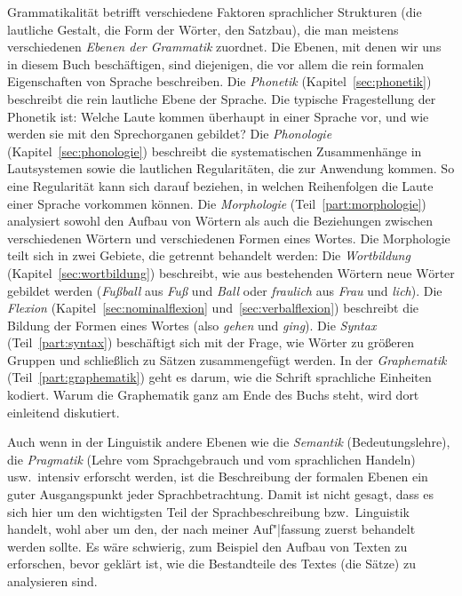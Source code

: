 Grammatikalität betrifft verschiedene Faktoren sprachlicher Strukturen (\zB die lautliche Gestalt, die Form der Wörter, den Satzbau), die man meistens verschiedenen \textit{Ebenen der Grammatik} zuordnet.
Die Ebenen, mit denen wir uns in diesem Buch beschäftigen, sind diejenigen, die vor allem die rein formalen Eigenschaften von Sprache beschreiben.
Die \textit{Phonetik} (Kapitel~\ref{sec:phonetik}) beschreibt die rein lautliche Ebene der Sprache.
Die typische Fragestellung der Phonetik ist:
Welche Laute kommen überhaupt in einer Sprache vor, und wie werden sie mit den Sprechorganen gebildet?
Die \textit{Phonologie} (Kapitel~\ref{sec:phonologie}) beschreibt die systematischen Zusammenhänge in Lautsystemen sowie die lautlichen Regularitäten, die zur Anwendung kommen.
So eine Regularität kann sich \zB darauf beziehen, in welchen Reihenfolgen die Laute einer Sprache vorkommen können.
Die \textit{Morphologie} (Teil~\ref{part:morphologie}) analysiert sowohl den Aufbau von Wörtern als auch die Beziehungen zwischen verschiedenen Wörtern und verschiedenen Formen eines Wortes.
Die Morphologie teilt sich in zwei Gebiete, die getrennt behandelt werden:
Die \textit{Wortbildung} (Kapitel~\ref{sec:wortbildung}) beschreibt, wie aus bestehenden Wörtern neue Wörter gebildet werden (\zB \textit{Fußball} aus \textit{Fuß} und \textit{Ball} oder \textit{fraulich} aus \textit{Frau} und \textit{lich}).
Die \textit{Flexion} (Kapitel~\ref{sec:nominalflexion} und~\ref{sec:verbalflexion}) beschreibt die Bildung der Formen eines Wortes (also \zB \textit{gehen} und \textit{ging}).
Die \textit{Syntax} (Teil~\ref{part:syntax}) beschäftigt sich mit der Frage, wie Wörter zu größeren Gruppen und schließlich zu Sätzen zusammengefügt werden.
In der \textit{Graphematik} (Teil~\ref{part:graphematik}) geht es darum, wie die Schrift sprachliche Einheiten kodiert.
Warum die Graphematik ganz am Ende des Buchs steht, wird dort einleitend diskutiert.

Auch wenn in der Linguistik andere Ebenen wie die \textit{Semantik} (Bedeutungslehre), die \textit{Pragmatik} (Lehre vom Sprachgebrauch und vom sprachlichen Handeln) usw.\ intensiv erforscht werden, ist die Beschreibung der formalen Ebenen ein guter Ausgangspunkt jeder Sprachbetrachtung.
Damit ist nicht gesagt, dass es sich hier um den wichtigsten Teil der Sprachbeschreibung bzw.\ Linguistik handelt, wohl aber um den, der nach meiner Auf"|fassung zuerst behandelt werden sollte.
Es wäre schwierig, zum Beispiel den Aufbau von Texten zu erforschen, bevor geklärt ist, wie die Bestandteile des Textes (die Sätze) zu analysieren sind.

